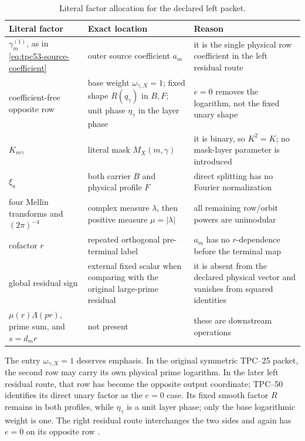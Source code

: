 \begin{table}[ht]
\centering
\small
\begin{tabular}{>{\raggedright\arraybackslash}p{}
                >{\raggedright\arraybackslash}p{}
                >{\raggedright\arraybackslash}p{}}
\toprule
Literal factor & Exact location & Reason \\
\midrule
\(\gamma_m^{(1)}\), as in
\eqref{eq:tpc53-source-coefficient}
& outer source coefficient \(a_m\)
& it is the single physical row coefficient in the left residual route \\
coefficient-free opposite row
& base weight \(\omega_{\gamma,X}=1\); fixed shape \(R(q_\gamma)\)
in \(B,F\); unit phase \(\eta_\gamma\) in the layer phase
& \(e=0\) removes the logarithm, not the fixed unary shape \\
\(K_{m\gamma}\)
& literal mask \(M_X(m,\gamma)\)
& it is binary, so \(K^2=K\); no mask-layer parameter is introduced \\
\(\xi_a\)
& both carrier \(B\) and physical profile \(F\)
& direct splitting has no Fourier normalization \\
four Mellin transforms and \((2\pi)^{-4}\)
& complex measure \(\lambda\), then positive measure \(\mu=|\lambda|\)
& all remaining row/orbit powers are unimodular \\
cofactor \(r\)
& repeated orthogonal pre-terminal label
& \(a_m\) has no \(r\)-dependence before the terminal map \\
global residual sign
& external fixed scalar when comparing with the original large-prime residual
& it is absent from the declared physical vector and vanishes from squared identities \\
\(\mu(r)\Lambda(pr)\), prime sum, and \(s=d_mr\)
& not present
& these are downstream operations \\
\bottomrule
\end{tabular}
\caption{Literal factor allocation for the declared left packet.}
\label{tab:tpc53-factor-allocation}
\end{table}

The entry \(\omega_{\gamma,X}=1\) deserves emphasis.  In the original
symmetric TPC--25 packet, the second row may carry its own physical
prime logarithm.  In the later left residual route, that row has become
the opposite output coordinate; TPC--50 identifies its direct unary
factor as the \(e=0\) case.  Its fixed smooth factor \(R\) remains in
both profiles, while \(\eta_\gamma\) is a unit layer phase; only the base
logarithmic weight is one.  The right residual route interchanges the
two sides and again has \(e=0\) on its opposite row
\citep{WangTPC25,WangTPC50}.

